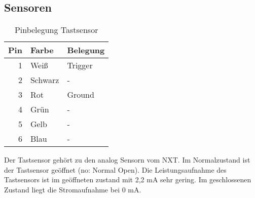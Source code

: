 \subsection{Sensoren}\label{eb:sensor}


\begin{table}[!ht]
\centering
\rmfamily
\caption{Pinbelegung Tastsensor}
\renewcommand{\arraystretch}{1.1}
\sffamily
\begin{footnotesize}
\begin{tabular}{r | l l}
\toprule
\textbf{Pin} & \textbf{Farbe}  & \textbf{Belegung}\\
\midrule
1 & Weiß & Trigger \\
2 & Schwarz & - \\
3 & Rot & Ground \\
4 & Grün & - \\
5 & Gelb & - \\
6 & Blau & - \\
\bottomrule
\end{tabular}
\end{footnotesize}
\label{tastsensor:tbl}
\end{table}
Der Tastsensor gehört zu den analog Sensorn vom NXT. Im Normalzustand ist der Tastsensor geöffnet (no: Normal Open). Die Leistungsaufnahme des Tastsensors ist im geöffneten zustand mit 2,2 mA sehr gering. Im geschlossenen Zustand liegt die Stromaufnahme bei 0 mA.



